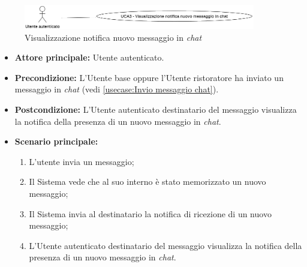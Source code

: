 \label{usecase:Visualizzazione notifica nuovo messaggio in chat}

\begin{figure}[h]
	\centering
	\includegraphics[width=0.9\textwidth]{./uml/UCA3.png} 
	\caption{Visualizzazione notifica nuovo messaggio in \textit{chat}}
	\label{fig:UCA3}
  \end{figure}

\begin{itemize}
    \item \textbf{Attore principale:} Utente autenticato.
	
	\item \textbf{Precondizione:} L'Utente base oppure l'Utente ristoratore ha inviato un messaggio in \textit{chat} (vedi \autoref{usecase:Invio messaggio chat}).

	\item \textbf{Postcondizione:} L'Utente autenticato destinatario del messaggio visualizza la notifica della presenza di un nuovo messaggio in \textit{chat}.
     
	\item \textbf{Scenario principale:}
	      \begin{enumerate}
                \item L'utente invia un messaggio;
                \item Il Sistema vede che al suo interno è stato memorizzato un nuovo messaggio;
                \item Il Sistema invia al destinatario la notifica di ricezione di un nuovo messaggio;
                \item L'Utente autenticato destinatario del messaggio visualizza la notifica della presenza di un nuovo messaggio in \textit{chat}.
	      \end{enumerate}
\end{itemize}